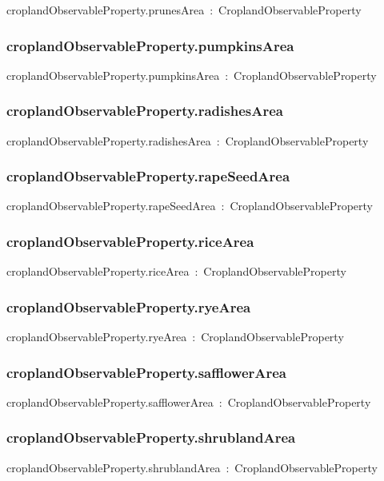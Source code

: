 \documentclass{article}
\begin{document}
croplandObservableProperty.prunesArea~:~CroplandObservableProperty

\subsubsection*{croplandObservableProperty.pumpkinsArea}

croplandObservableProperty.pumpkinsArea~:~CroplandObservableProperty

\subsubsection*{croplandObservableProperty.radishesArea}

croplandObservableProperty.radishesArea~:~CroplandObservableProperty

\subsubsection*{croplandObservableProperty.rapeSeedArea}

croplandObservableProperty.rapeSeedArea~:~CroplandObservableProperty

\subsubsection*{croplandObservableProperty.riceArea}

croplandObservableProperty.riceArea~:~CroplandObservableProperty

\subsubsection*{croplandObservableProperty.ryeArea}

croplandObservableProperty.ryeArea~:~CroplandObservableProperty

\subsubsection*{croplandObservableProperty.safflowerArea}

croplandObservableProperty.safflowerArea~:~CroplandObservableProperty

\subsubsection*{croplandObservableProperty.shrublandArea}

croplandObservableProperty.shrublandArea~:~CroplandObservableProperty
\end{document}
